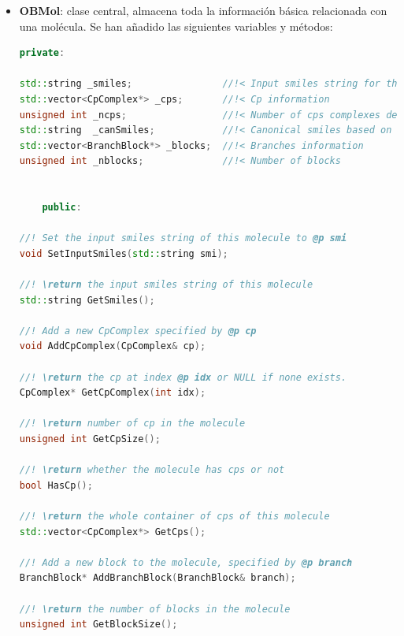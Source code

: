 \begin{itemize}
\begin{lstlisting}[language=C++]
//\return Is this a metal commonnly present in organometallic compounds?
bool IsOgmMetal();

//\return Is atom part of a Cp ring?
bool IsInCp() const;

//\return Is this atom a Carbon (atomic number == 6)?
bool IsCarbon();

//Debug method. Displays on basic output simple data to identify the atom
void Show();

//Mark an atom as part of a Cp ring
void SetInCp(bool value = true);
    \end{lstlisting}


    \item \textbf{OBMol}: clase central, almacena toda la información básica relacionada con una molécula. Se han añadido las siguientes variables y métodos:
    \begin{lstlisting}[language=C++]
    private: 
    
std::string _smiles;                //!< Input smiles string for the molecule
std::vector<CpComplex*> _cps;       //!< Cp information
unsigned int _ncps;                 //!< Number of cps complexes detected
std::string  _canSmiles;            //!< Canonical smiles based on Ogm canonicalization
std::vector<BranchBlock*> _blocks;  //!< Branches information
unsigned int _nblocks;              //!< Number of blocks


    public: 
    
//! Set the input smiles string of this molecule to @p smi
void SetInputSmiles(std::string smi);

//! \return the input smiles string of this molecule
std::string GetSmiles();

//! Add a new CpComplex specified by @p cp
void AddCpComplex(CpComplex& cp);

//! \return the cp at index @p idx or NULL if none exists.
CpComplex* GetCpComplex(int idx);

//! \return number of cp in the molecule
unsigned int GetCpSize();

//! \return whether the molecule has cps or not
bool HasCp();

//! \return the whole container of cps of this molecule
std::vector<CpComplex*> GetCps();

//! Add a new block to the molecule, specified by @p branch
BranchBlock* AddBranchBlock(BranchBlock& branch);

//! \return the number of blocks in the molecule
unsigned int GetBlockSize();


\end{lstlisting}
\end{itemize}
